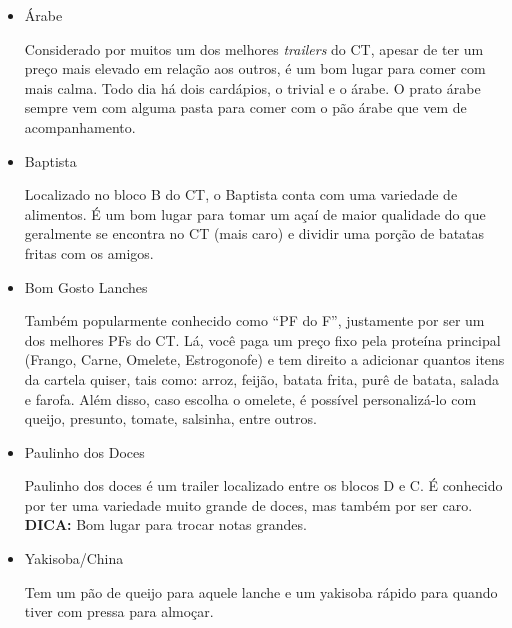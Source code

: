     \begin{itemize}
    \item Árabe
    
    Considerado por muitos um dos melhores \textit{trailers} do CT, apesar de ter um preço mais elevado em relação aos outros, é um bom lugar para comer com mais calma. Todo dia há dois cardápios, o trivial e o árabe. O prato árabe sempre vem com alguma pasta para comer com o pão árabe que vem de acompanhamento.
    
    \item Baptista
	
    Localizado no bloco B do CT, o Baptista conta com uma variedade de alimentos. É um bom lugar para tomar um açaí de maior qualidade do que geralmente se encontra no CT (mais caro) e dividir uma porção de batatas fritas com os amigos.

    \item Bom Gosto Lanches
    
    Também popularmente conhecido como ``PF do F'', justamente por ser um dos melhores PFs do CT. Lá, você paga um preço fixo pela proteína principal (Frango, Carne, Omelete, Estrogonofe) e tem direito a adicionar quantos itens da cartela quiser, tais como: arroz, feijão, batata frita, purê de batata, salada e farofa. Além disso, caso escolha o omelete, é possível personalizá-lo com queijo, presunto, tomate, salsinha, entre outros.
    
    \item Paulinho dos Doces
	
    Paulinho dos doces é um trailer localizado entre os blocos D e C. É conhecido por ter uma variedade muito grande de doces, mas também por ser caro. \textbf{DICA:} Bom lugar para trocar notas grandes.

    \item Yakisoba/China
    
    Tem um pão de queijo para aquele lanche e um yakisoba rápido para quando tiver com pressa para almoçar.
    
    
    \end{itemize}
    
    

